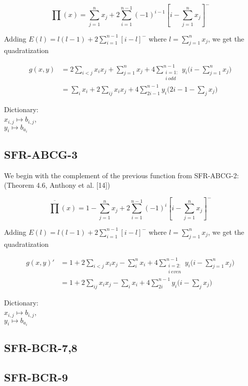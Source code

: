 \documentclass[a4paper,11pt]{article}
\begin{document}
\begin{equation}
  \prod{(x)} = \sum_{j=1}^n x_j + 2\sum_{i=1}^{n-1}(-1)^{i-1}\left[i - \sum_{j=1}^{n}x_j\right]^-
\end{equation}

\noindent Adding $E(l) = l(l-1) + 2\sum_{i=1}^{n-1}\left[i-l\right]^-$ where $l = \sum_{j=1}^n x_j$, we get the quadratization

\begin{equation}
\begin{split}
  \left.
  g(x,y)
  \right.
  &= 2\sum_{i<j}x_ix_j + \sum_{j=1}^n x_j + 4\sum_{\substack{i = 1:\\ i\:odd}}^{n-1}y_i\Big(i - \sum_{j=1}^n x_j\Big)\\
  &= \sum_{i}x_i + 2\sum_{ij}x_ix_j + 4\sum_{2i-1}^{n-1}y_i\Big(2i - 1 - \sum_{j}x_j\Big)
  \end{split}
\end{equation}

\noindent Dictionary:\\
$x_{i,j}\mapsto b_{i,j}$,\\
$y_{i}\mapsto b_{a_i}$\\



\subsection{SFR-ABCG-3}
We begin with the complement of the previous function from SFR-ABCG-2:
\\(Theorem 4.6, Anthony et al. [14])

\begin{equation}
  \overline{\prod}(x) = 1 - \sum_{j=1}^n x_j + 2\sum_{i=1}^{n-1}(-1)^{i}\left[i - \sum_{j=1}^{n}x_j\right]^-
\end{equation}

\noindent Adding $E(l) = l(l-1) + 2\sum_{i=1}^{n-1}\left[i-l\right]^-$ where $l = \sum_{j=1}^n x_j$, we get the quadratization

\begin{equation}
\begin{split}
  \left.
  g(x,y)'
  \right.
  &= 1 + 2\sum_{i<j}x_ix_j - \sum_{i}^n x_i + 4\sum_{\substack{i = 2:\\ i\:even}}^{n-1}y_i\Big(i - \sum_{j=1}^n x_j\Big)\\
  &= 1 + 2\sum_{ij}x_ix_j - \sum_{i} x_i + 4\sum_{2i}^{n-1}y_i\Big(i - \sum_{j} x_j\Big)
  \end{split}
\end{equation}

\noindent Dictionary:\\
$x_{i,j}\mapsto b_{i,j}$,\\
$y_{i}\mapsto b_{a_i}$\\



\subsection{SFR-BCR-7,8}


\subsection{SFR-BCR-9}
\end{document}
